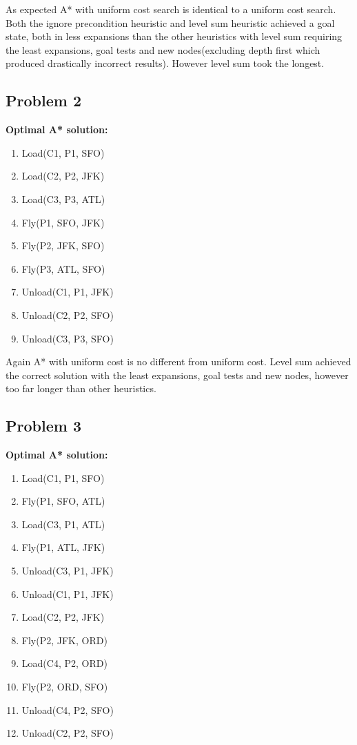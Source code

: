 \documentclass[11pt]{article}
\begin{document}
As expected A* with uniform cost search is identical to  a uniform cost search. Both the ignore precondition heuristic and level sum heuristic achieved a goal state, both in less expansions than the other heuristics with level sum requiring the least expansions, goal tests and new nodes(excluding depth first which produced drastically incorrect results). However level sum took the longest.

\subsection{Problem 2}
\textbf{Optimal A* solution:}
\begin{enumerate}
	\item Load(C1, P1, SFO)
	\item Load(C2, P2, JFK)
	\item Load(C3, P3, ATL)
	\item Fly(P1, SFO, JFK)
	\item Fly(P2, JFK, SFO)
	\item Fly(P3, ATL, SFO)
	\item Unload(C1, P1, JFK)
	\item Unload(C2, P2, SFO)
	\item Unload(C3, P3, SFO)
\end{enumerate}

Again A* with uniform cost is no different from uniform cost. Level sum achieved the correct solution with the least expansions, goal tests and new nodes, however too far longer than other heuristics.

\subsection{Problem 3}
\textbf{Optimal A* solution:}
\begin{enumerate}
	\item Load(C1, P1, SFO)
	\item Fly(P1, SFO, ATL)
	\item Load(C3, P1, ATL)
	\item Fly(P1, ATL, JFK)
	\item Unload(C3, P1, JFK)
	\item Unload(C1, P1, JFK)
	\item Load(C2, P2, JFK)
	\item Fly(P2, JFK, ORD)
	\item Load(C4, P2, ORD)
	\item Fly(P2, ORD, SFO)
	\item Unload(C4, P2, SFO)
	\item Unload(C2, P2, SFO)
\end{enumerate}
\end{document}
